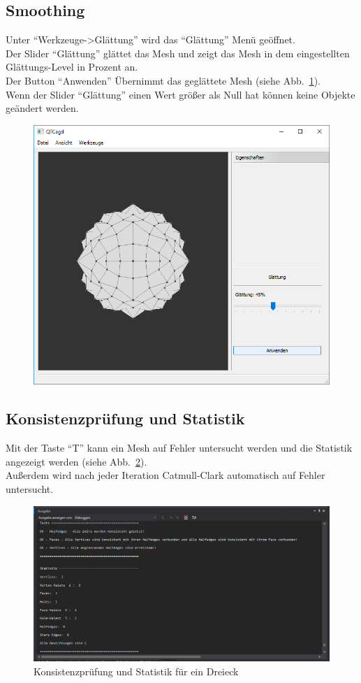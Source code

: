 \subsection{Smoothing}
Unter "`Werkzeuge->Glättung"' wird das "`Glättung"' Menü geöffnet.\\
Der Slider "`Glättung"' glättet das Mesh und zeigt das Mesh in dem eingestellten Glättungs-Level in Prozent an.\\
Der Button "`Anwenden"' Übernimmt das geglättete Mesh (siehe Abb.~\ref{fig:Smoothing}).\\
Wenn der Slider "`Glättung"' einen Wert grö\ss{}er als Null hat können keine Objekte geändert werden.

\begin{figure}[H]
	\centering
	\includegraphics[scale=0.5]{content/pictures/10-Smoothing}
	\caption{}
	\label{fig:Smoothing}
\end{figure}

\subsection{Konsistenzprüfung und Statistik}
Mit der Taste "`T"' kann ein Mesh auf Fehler untersucht werden und die Statistik angezeigt werden (siehe Abb.~\ref{fig:TestStatistik}).\\
Au\ss{}erdem wird nach jeder Iteration Catmull-Clark automatisch auf Fehler untersucht.

\begin{figure}[H]
	\centering
	\includegraphics[scale=0.5]{content/pictures/11-TestStatistik}
	\caption{Konsistenzprüfung und Statistik für ein Dreieck}
	\label{fig:TestStatistik}
\end{figure}
